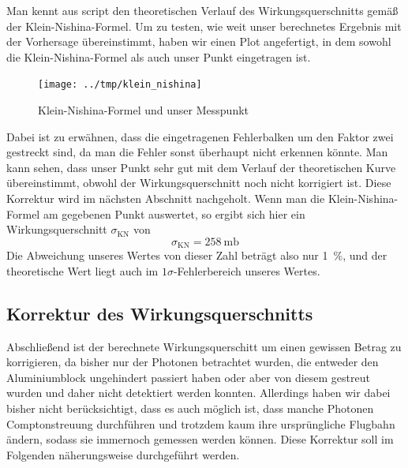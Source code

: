 Man kennt aus \cite{Gl.3}{script} den theoretischen Verlauf des Wirkungsquerschnitts
gemäß der Klein-Nishina-Formel. Um zu testen, wie weit unser berechnetes Ergebnis mit
der Vorhersage übereinstimmt, haben wir einen Plot  angefertigt,
in dem sowohl die Klein-Nishina-Formel als auch unser Punkt eingetragen ist.
\begin{figure}[htb]
      \centering
      \texttt{[image: ../tmp/klein\_nishina]}
      \caption{Klein-Nishina-Formel und unser Messpunkt}
      \label{fig:klein_nishina}
\end{figure}
Dabei ist zu erwähnen, dass die eingetragenen Fehlerbalken um den Faktor zwei
gestreckt sind, da man die Fehler sonst überhaupt nicht erkennen könnte. Man kann
sehen, dass unser Punkt sehr gut mit dem Verlauf der theoretischen Kurve übereinstimmt,
obwohl der Wirkungsquerschnitt noch nicht korrigiert ist. Diese Korrektur wird im
nächsten Abschnitt nachgeholt. Wenn man die Klein-Nishina-Formel am gegebenen Punkt
auswertet, so ergibt sich hier ein Wirkungsquerschnitt $\sigma_{\mathrm{KN}}$ von
\begin{equation}
\sigma_{\mathrm{KN}} = \SI{258}{\milli\barn}
\end{equation}
Die Abweichung unseres Wertes von dieser Zahl beträgt also nur \SI{1}{\percent},
und der theoretische Wert liegt auch im $1\sigma$-Fehlerbereich unseres Wertes.

\subsection{Korrektur des Wirkungsquerschnitts}
Abschließend ist der berechnete Wirkungsquerschitt um einen gewissen Betrag zu
korrigieren, da bisher nur der Photonen betrachtet wurden, die entweder den
Aluminiumblock ungehindert passiert haben oder aber von diesem gestreut wurden
und daher nicht detektiert werden konnten. Allerdings haben wir dabei bisher
nicht berücksichtigt, dass es auch möglich ist, dass manche Photonen
Comptonstreuung durchführen und trotzdem kaum ihre ursprüngliche Flugbahn
ändern, sodass sie immernoch gemessen werden können. Diese Korrektur soll im
Folgenden näherungsweise durchgeführt werden.

